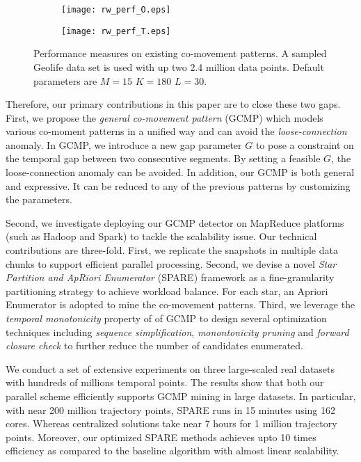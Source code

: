 \begin{figure}[h]
    \centering
    \begin{subfigure}[b]{0.23\textwidth}
            \centering
            \texttt{[image: rw\_perf\_O.eps]}
    \label{fig:fig1}
    \end{subfigure}
    \begin{subfigure}[b]{0.23\textwidth}
            \centering
            \texttt{[image: rw\_perf\_T.eps]}
    \label{fig:fig2}
    \end{subfigure}
    \caption{Performance measures on existing co-movement patterns. A sampled Geolife data set
    is used with up two 2.4 million data points. Default parameters are $M=15$ $K=180$ $L=30$.}
    \label{fig:related_work_scalability}
\end{figure}




Therefore, our primary contributions in this paper are to close these two gaps. 
First, we propose the \emph{general co-movement pattern} (GCMP) which models
various co-moment patterns in a unified way and can avoid 
the \emph{loose-connection} anomaly. In GCMP, we introduce a new gap parameter $G$ to pose a constraint on the temporal gap between two consecutive segments. By setting a feasible $G$, the loose-connection anomaly can be avoided. In addition, our GCMP is both general and expressive. It can be reduced to any of the previous patterns by customizing the parameters.

Second, we investigate deploying our GCMP detector on MapReduce platforms (such as Hadoop and Spark) to tackle the scalability issue. Our technical contributions are three-fold. First, we replicate the snapshots in multiple data chunks to support efficient parallel processing. Second, we devise a novel \emph{Star Partition and ApRiori Enumerator} (SPARE) framework as a fine-granularity partitioning strategy to achieve workload balance. For each star, an Apriori Enumerator is adopted to mine the co-movement patterns. Third, we leverage the \emph{temporal monotonicity} property of of GCMP 
to design several optimization techniques including \emph{sequence simplification}, \emph{monontonicity pruning} and \emph{forward closure check} to further reduce the number of candidates enumerated.

We conduct a set of extensive experiments on three large-scaled real datasets with hundreds of millions 
temporal points. 
The results show that both our parallel scheme efficiently supports GCMP mining in large datasets.
In particular, with near 200 million trajectory points, 
SPARE runs in 15 minutes using 162 cores. Whereas
centralized solutions take near 7 hours 
for 1 million trajectory points.
Moreover, our optimized SPARE methods achieves upto 10 times efficiency
as compared to the baseline algorithm with almost linear scalability.

